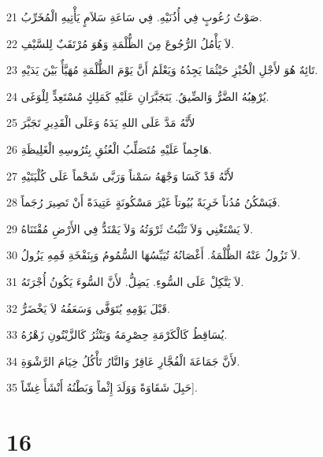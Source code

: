 \par 21 صَوْتُ رُعُوبٍ فِي أُذُنَيْهِ. فِي سَاعَةِ سَلاَمٍ يَأْتِيهِ الْمُخَرِّبُ.
\par 22 لاَ يَأْمُلُ الرُّجُوعَ مِنَ الظُّلْمَةِ وَهُوَ مُرْتَقَبٌ لِلسَّيْفِ.
\par 23 تَائِهٌ هُوَ لأَجْلِ الْخُبْزِ حَيْثُمَا يَجِدُهُ وَيَعْلَمُ أَنَّ يَوْمَ الظُّلْمَةِ مُهَيَّأٌ بَيْنَ يَدَيْهِ.
\par 24 يُرْهِبُهُ الضَّرُّ وَالضِّيقُ. يَتَجَبَّرَانِ عَلَيْهِ كَمَلِكٍ مُسْتَعِدٍّ لِلْوَغَى.
\par 25 لأَنَّهُ مَدَّ عَلَى اللهِ يَدَهُ وَعَلَى الْقَدِيرِ تَجَبَّرَ
\par 26 هَاجِماً عَلَيْهِ مُتَصَلِّبُ الْعُنُقِ بِتُرُوسِهِ الْغَلِيظَةِ.
\par 27 لأَنَّهُ قَدْ كَسَا وَجْهَهُ سَمْناً وَرَبَّى شَحْماً عَلَى كُلْيَتَيْهِ
\par 28 فَيَسْكُنُ مُدُناً خَرِبَةً بُيُوتاً غَيْرَ مَسْكُونَةٍ عَتِيدَةً أَنْ تَصِيرَ رُجَماً.
\par 29 لاَ يَسْتَغْنِي وَلاَ تَثْبُتُ ثَرْوَتُهُ وَلاَ يَمْتَدُّ فِي الأَرْضِ مُقْتَنَاهُ.
\par 30 لاَ تَزُولُ عَنْهُ الظُّلْمَةُ. أَغْصَانُهُ تُيَبِّسُهَا السُّمُومُ وَبِنَفْخَةِ فَمِهِ يَزُولُ.
\par 31 لاَ يَتَّكِلْ عَلَى السُّوءِ. يَضِلُّ. لأَنَّ السُّوءَ يَكُونُ أُجْرَتَهُ.
\par 32 قَبْلَ يَوْمِهِ يُتَوَفَّى وَسَعَفُهُ لاَ يَخْضَرُّ.
\par 33 يُسَاقِطُ كَالْكَرْمَةِ حِصْرِمَهُ وَيَنْثُرُ كَالزَّيْتُونِ زَهْرُهُ.
\par 34 لأَنَّ جَمَاعَةَ الْفُجَّارِ عَاقِرٌ وَالنَّارُ تَأْكُلُ خِيَامَ الرَّشْوَةِ.
\par 35 حَبِلَ شَقَاوَةً وَوَلَدَ إِثْماً وَبَطْنُهُ أَنْشَأَ غِشّاً].

\chapter{16}

